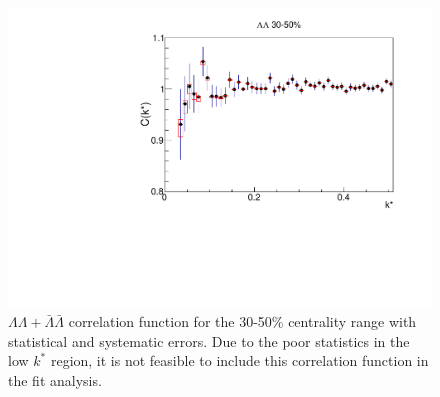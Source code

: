 \begin{figure}[hbtp]
\includegraphics[width=36pc]{Figures/CFs/2016-8-30-CFLLAA3050CombinedSystematicsMaximum.pdf}
\caption[$\Lambda\Lambda + \bar{\Lambda}\bar{\Lambda}$ correlation function for the 30-50\% centrality range]{$\Lambda\Lambda + \bar{\Lambda}\bar{\Lambda}$ correlation function for the 30-50\% centrality range with statistical and systematic errors.  
Due to the poor statistics in the low $k^*$ region, it is not feasible to include this correlation function in the fit analysis.}
\label{fig:CFLamLamALamALam3050}
\end{figure}

